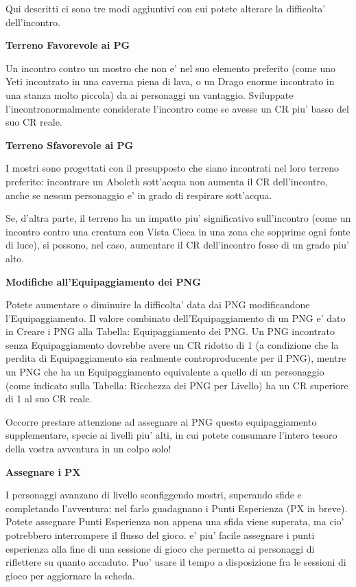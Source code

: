 \documentclass[a4paper,11pt,twoside,openany]{dndbook}
\begin{document}
Qui descritti ci sono tre modi aggiuntivi con cui potete alterare la difficolta' dell'incontro.

\textbf{Terreno Favorevole ai PG}

Un incontro contro un mostro che non e' nel suo elemento preferito (come uno Yeti incontrato in una caverna piena di lava, o un Drago enorme incontrato in una stanza molto piccola) da ai personaggi un vantaggio. Sviluppate l'incontronormalmente considerate l'incontro come se avesse un CR piu' basso del suo CR reale.

\textbf{Terreno Sfavorevole ai PG}

I mostri sono progettati con il presupposto che siano incontrati nel loro terreno preferito: incontrare un Aboleth sott’acqua non aumenta il CR dell'incontro, anche se nessun personaggio e' in grado di respirare sott'acqua. 

Se, d’altra parte, il terreno ha un impatto piu' significativo sull'incontro (come un incontro contro una creatura con Vista Cieca in una zona che sopprime ogni fonte di luce), si possono, nel caso, aumentare il CR dell'incontro fosse di un grado piu' alto.


\textbf{Modifiche all'Equipaggiamento dei PNG}

Potete aumentare o diminuire la difficolta' data dai PNG modificandone l'Equipaggiamento. Il valore combinato dell'Equipaggiamento di un PNG e' dato in Creare i PNG alla Tabella: Equipaggiamento dei PNG. Un PNG incontrato senza Equipaggiamento dovrebbe avere un CR ridotto di 1 (a condizione che la perdita di Equipaggiamento sia realmente controproducente per il PNG), mentre un PNG che ha un Equipaggiamento equivalente a quello di un personaggio (come indicato sulla Tabella: Ricchezza dei PNG per Livello) ha un CR superiore di 1 al suo CR reale.

Occorre prestare attenzione ad assegnare ai PNG questo equipaggiamento supplementare, specie ai livelli piu' alti, in cui potete consumare l'intero tesoro della vostra avventura in un colpo solo!

\textbf{Assegnare i PX}

I personaggi avanzano di livello sconfiggendo mostri, superando sfide e completando l'avventura: nel farlo guadagnano i Punti Esperienza (PX in breve). Potete assegnare Punti Esperienza non appena una sfida viene superata, ma cio' potrebbero interrompere il flusso del gioco. e' piu' facile assegnare i punti esperienza alla fine di una sessione di gioco che permetta ai personaggi di riflettere su quanto accaduto. Puo' usare il tempo a disposizione fra le sessioni di gioco per aggiornare la scheda.
\end{document}
